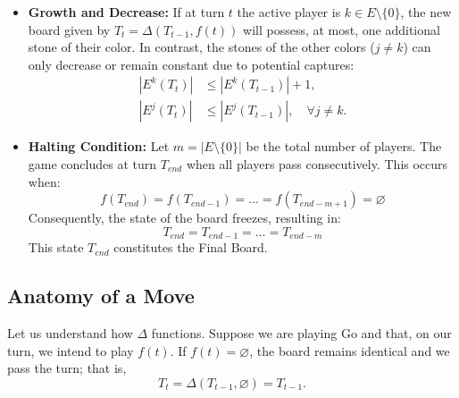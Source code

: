 \begin{itemize}
	\item \textbf{Growth and Decrease:} If at turn \(t\) the active player is \(k \in E \setminus \{0\}\), the new board given by \(T_t = \Delta(T_{t-1}, f(t))\) will possess, at most, one additional stone of their color. In contrast, the stones of the other colors (\(j \neq k\)) can only decrease or remain constant due to potential captures:
	\begin{align*}
		|E^k(T_t)| &\le |E^k(T_{t-1})| + 1,\\
		|E^j(T_t)| &\le |E^j(T_{t-1})|, \quad \forall j \neq k.
	\end{align*}
	
	\item \textbf{Halting Condition:} Let \(m = |E \setminus \{0\}|\) be the total number of players. The game concludes at turn \(T_{end}\) when all players pass consecutively. This occurs when:
	$$f(T_{end}) = f(T_{end-1}) = \dots = f(T_{end-m+1}) = \varnothing$$
	Consequently, the state of the board freezes, resulting in:
	$$T_{{end}} = T_{{end-1}} = \dots = T_{{end-m}}$$
	This state \(T_{{end}}\) constitutes the Final Board.
\end{itemize}


\subsection{Anatomy of a Move}

Let us understand how \(\Delta\) functions. Suppose we are playing Go and that, on our turn, we intend to play \(f(t)\).
If \(f(t) = \varnothing\), the board remains identical and we pass the turn; that is,
$$T_{t} = \Delta(T_{t-1}, \varnothing) = T_{t-1}.$$

